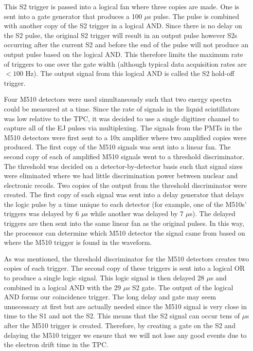This S2 trigger is passed into a logical fan where three copies are made.  One is sent into a gate generator that produces a 100 $\mu$s \nimbar{} pulse.  The \nimbar{} pulse is combined with another copy of the S2 trigger in a logical AND.  Since there is no delay on the S2 pulse, the original S2 trigger will result in an output pulse however S2s occurring after the current S2 and before the end of the \nimbar{} pulse will not produce an output pulse based on the logical AND.  This therefore limits the maximum rate of triggers to one over the gate width (although typical data acquisition rates are $< 100$ Hz).   The output signal from this logical AND is called the S2 hold-off trigger.

Four M510 detectors were used simultaneously such that two energy spectra could be measured at a time.  Since the rate of signals in the liquid scintillators was low relative to the TPC, it was decided to use a single digitizer channel to capture all of the EJ pulses via multiplexing.  The signals from the PMTs in the M510 detectors were first sent to a 10x amplifier where two amplified copies were produced.  The first copy of the M510 signals was sent into a linear fan.  The second copy of each of amplified M510 signals went to a threshold discriminator.  The threshold was decided on a detector-by-detector basis such that signal sizes were eliminated where we had little discrimination power between nuclear and electronic recoils.  Two copies of the output from the threshold discriminator were created.  The first copy of each signal was sent into a delay generator that delays the logic pulse by a time unique to each detector (for example, one of the M510s' triggers was delayed by 6 $\mu$s while another was delayed by 7 $\mu$s).  The delayed triggers are then sent into the same linear fan as the original pulses.  In this way, the processor can determine which M510 detector the signal came from based on where the M510 trigger is found in the waveform.  

As was mentioned, the threshold discriminator for the M510 detectors creates two copies of each trigger.  The second copy of these triggers is sent into a logical OR to produce a single logic signal.  This logic signal is then delayed 28 $\mu$s and combined in a logical AND with the 29 $\mu$s S2 gate.  The output of the logical AND forms our coincidence trigger.  The long delay and gate may seem unnecessary at first but are actually needed since the M510 signal is very close in time to the S1 and not the S2.  This means that the S2 signal can occur tens of $\mu$s after the M510 trigger is created.  Therefore, by creating a gate on the S2 and delaying the M510 trigger we ensure that we will not lose any good events due to the electron drift time in the TPC.  




